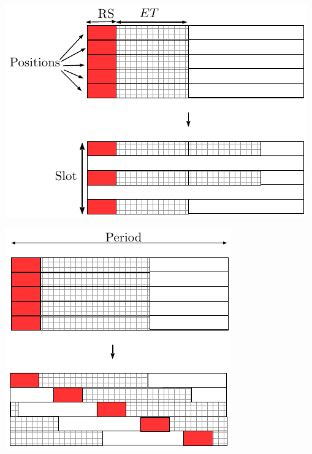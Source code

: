 \documentclass[]{llncs}
\begin{document}
     \begin{minipage}[b]{0.5\linewidth}
        \begin{center}
      \includegraphics[scale=0.55]{repart2}
            
          \label{fig:repart1}
      \end{center} 
  \end{minipage}
    \begin{minipage}[b]{0.5\linewidth}
        \begin{center}
      \includegraphics[scale=0.55]{repart1}
      
          \label{fig:repart2}
      \end{center} 
  \end{minipage}
\end{document}
